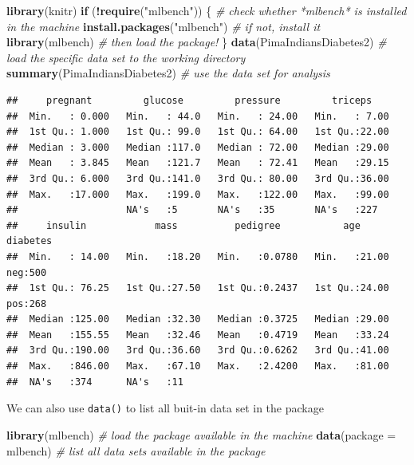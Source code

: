 \documentclass[
]{book}
\newenvironment{Shaded}{\begin{snugshade}}{\end{snugshade}}
\newcommand{\AttributeTok}[1]{\textcolor[rgb]{0.13,0.29,0.53}{#1}}
\newcommand{\CommentTok}[1]{\textcolor[rgb]{0.56,0.35,0.01}{\textit{#1}}}
\newcommand{\ControlFlowTok}[1]{\textcolor[rgb]{0.13,0.29,0.53}{\textbf{#1}}}
\newcommand{\FunctionTok}[1]{\textcolor[rgb]{0.13,0.29,0.53}{\textbf{#1}}}
\newcommand{\NormalTok}[1]{#1}
\newcommand{\SpecialCharTok}[1]{\textcolor[rgb]{0.81,0.36,0.00}{\textbf{#1}}}
\newcommand{\StringTok}[1]{\textcolor[rgb]{0.31,0.60,0.02}{#1}}
\begin{document}
\begin{Shaded}
\begin{Highlighting}[]
\FunctionTok{library}\NormalTok{(knitr)}
\ControlFlowTok{if}\NormalTok{ (}\SpecialCharTok{!}\FunctionTok{require}\NormalTok{(}\StringTok{"mlbench"}\NormalTok{)) \{      }\CommentTok{\# check whether *mlbench* is installed in the machine }
   \FunctionTok{install.packages}\NormalTok{(}\StringTok{"mlbench"}\NormalTok{)  }\CommentTok{\# if not, install it}
   \FunctionTok{library}\NormalTok{(mlbench)             }\CommentTok{\# then load the package!}
\NormalTok{\}}
\FunctionTok{data}\NormalTok{(PimaIndiansDiabetes2)      }\CommentTok{\# load the specific data set to the working directory}
\FunctionTok{summary}\NormalTok{(PimaIndiansDiabetes2)   }\CommentTok{\# use the data set for analysis}
\end{Highlighting}
\end{Shaded}

\begin{verbatim}
##     pregnant         glucose         pressure         triceps     
##  Min.   : 0.000   Min.   : 44.0   Min.   : 24.00   Min.   : 7.00  
##  1st Qu.: 1.000   1st Qu.: 99.0   1st Qu.: 64.00   1st Qu.:22.00  
##  Median : 3.000   Median :117.0   Median : 72.00   Median :29.00  
##  Mean   : 3.845   Mean   :121.7   Mean   : 72.41   Mean   :29.15  
##  3rd Qu.: 6.000   3rd Qu.:141.0   3rd Qu.: 80.00   3rd Qu.:36.00  
##  Max.   :17.000   Max.   :199.0   Max.   :122.00   Max.   :99.00  
##                   NA's   :5       NA's   :35       NA's   :227    
##     insulin            mass          pedigree           age        diabetes 
##  Min.   : 14.00   Min.   :18.20   Min.   :0.0780   Min.   :21.00   neg:500  
##  1st Qu.: 76.25   1st Qu.:27.50   1st Qu.:0.2437   1st Qu.:24.00   pos:268  
##  Median :125.00   Median :32.30   Median :0.3725   Median :29.00            
##  Mean   :155.55   Mean   :32.46   Mean   :0.4719   Mean   :33.24            
##  3rd Qu.:190.00   3rd Qu.:36.60   3rd Qu.:0.6262   3rd Qu.:41.00            
##  Max.   :846.00   Max.   :67.10   Max.   :2.4200   Max.   :81.00            
##  NA's   :374      NA's   :11
\end{verbatim}

We can also use \texttt{data()} to list all buit-in data set in the package

\begin{Shaded}
\begin{Highlighting}[]
\FunctionTok{library}\NormalTok{(mlbench)             }\CommentTok{\# load the package available in the machine}
\FunctionTok{data}\NormalTok{(}\AttributeTok{package =} \StringTok{\textquotesingle{}mlbench\textquotesingle{}}\NormalTok{)    }\CommentTok{\# list all data sets available in the package}
\end{Highlighting}
\end{Shaded}
\end{document}
